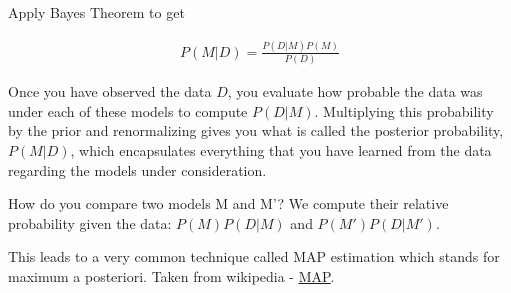 \documentclass[12pt]{article}
\begin{document}
Apply Bayes Theorem to get

\begin{align*}
P(M|D) = \frac{P(D|M)P(M)}{P(D)}
\end{align*}

Once you have observed the data $D$, you evaluate how probable the data was under each of these models to compute $P(D|M)$. Multiplying this probability by the prior and renormalizing gives you what is called the posterior probability, $P(M|D)$, which encapsulates everything that you have learned from the data regarding the models under consideration. 

How do you compare two models M and M'? We compute their relative probability given the data: $P(M)P(D|M)$ and $P(M')P(D|M')$.

This leads to a very common technique called MAP estimation which stands for maximum a posteriori. Taken from wikipedia - \href{http://en.wikipedia.org/wiki/Maximum_a_posteriori_estimation}{\underline{MAP}}.
\end{document}
